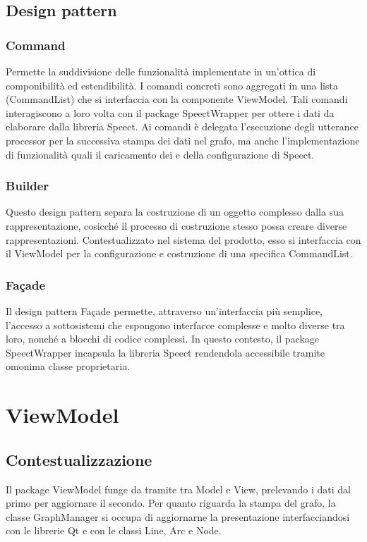 \documentclass[openany,12pt,a4paper]{report}
\begin{document}
\newpage

\subsection{Design pattern}

\subsubsection{Command}
Permette la suddivisione delle funzionalità implementate in un'ottica di componibilità ed estendibilità. I comandi concreti sono aggregati in una lista (CommandList) che si interfaccia con la componente ViewModel. Tali comandi interagiscono a loro volta con il package SpeectWrapper per ottere i dati da elaborare dalla libreria Speect. Ai comandi è delegata l'esecuzione degli utterance processor per la successiva stampa dei dati nel grafo, ma anche l'implementazione di funzionalità quali il caricamento dei  e della configurazione di Speect.

\subsubsection{Builder}
Questo design pattern separa la costruzione di un oggetto complesso dalla sua rappresentazione, cosicché il processo di costruzione stesso possa creare diverse rappresentazioni. Contestualizzato nel sistema del prodotto, esso si interfaccia con il ViewModel per la configurazione e costruzione di una specifica CommandList.

\subsubsection{Façade} 
Il design pattern Façade permette, attraverso un'interfaccia più semplice, l'accesso a sottosistemi che espongono interfacce complesse e molto diverse tra loro, nonché a blocchi di codice complessi. In questo contesto, il package SpeectWrapper incapsula la libreria Speect rendendola accessibile tramite omonima classe proprietaria.

\newpage

\section{ViewModel}

\subsection{Contestualizzazione}
Il package ViewModel funge da tramite tra Model e View, prelevando i dati dal primo per aggiornare il secondo. Per quanto riguarda la stampa del grafo, la classe GraphManager si occupa di aggiornarne la presentazione interfacciandosi con le librerie Qt e con le classi Line, Arc e Node.  
\end{document}
